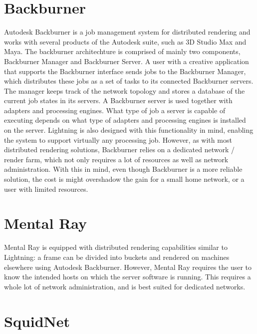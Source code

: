 \section{Backburner}

Autodesk Backburner is a job management system for distributed rendering and works with several products of the Autodesk suite, such as 3D Studio Max and Maya. The backburner architechture is comprised of mainly two components, Backburner Manager and Backburner Server. A user with a creative application that supports the Backburner interface sends jobs to the Backburner Manager, which distributes these jobs as a set of tasks to its connected Backburner servers. The manager keeps track of the network topology and stores a database of the current job states in its servers. A Backburner server is used together with adapters and processing engines. What type of job a server is capable of executing depends on what type of adapters and processing engines is installed on the server. Lightning is also designed with this functionality in mind, enabling the system to support virtually any processing job. However, as with most distributed rendering solutions, Backburner relies on a dedicated network / render farm, which not only requires a lot of resources as well as network administration. With this in mind, even though Backburner is a more reliable solution, the cost is might overshadow the gain for a small home network, or a user with limited resources. 

\section{Mental Ray}


Mental Ray is equipped with distributed rendering capabilities similar to Lightning: a frame can be divided into buckets and rendered on machines elsewhere using Autodesk Backburner. However, Mental Ray requires the user to know the intended hosts on which the server software is running. This requires a whole lot of network administration, and is best suited for dedicated networks. 

\section{SquidNet}

